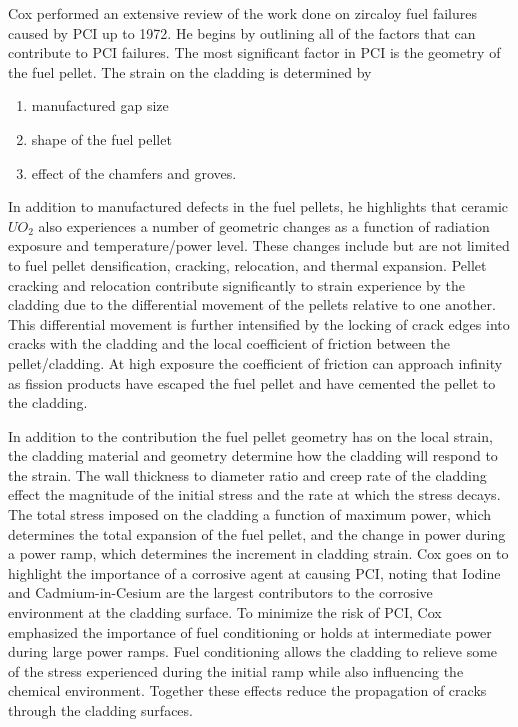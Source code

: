 \documentclass[edeposit,fullpage]{uiucthesis2009}
\begin{document}
Cox \cite{cox_pellet-clad_1990} performed an extensive review of the work done on zircaloy fuel failures caused by \gls{PCI} up to 1972.
He begins by outlining all of the factors that can contribute to \gls{PCI} failures.
The most significant factor in \gls{PCI} is the geometry of the fuel pellet. 
The strain on the cladding is determined by
\begin{enumerate}
\item manufactured gap size
\item shape of the fuel pellet
\item effect of the chamfers and groves.
\end{enumerate} 
In addition to manufactured defects in the fuel pellets, he highlights that ceramic $UO_2$ also experiences a number of geometric changes as a function of radiation exposure and temperature/power level.
These changes include but are not limited to fuel pellet  densification, cracking, relocation, and thermal expansion. 
Pellet cracking and relocation contribute significantly to strain experience by the cladding due to the differential movement of the pellets  relative to one another.
This differential movement is further intensified  by the locking of crack edges into cracks with the cladding and the local coefficient of friction between the pellet/cladding.
At high exposure the coefficient of friction can approach infinity as fission products have escaped the fuel pellet and have cemented the pellet to the cladding. 

In addition to the contribution the fuel pellet geometry has on the local strain, the cladding material and geometry determine how the cladding will respond to the strain.
The wall thickness to diameter ratio and creep rate of the cladding effect the magnitude of the initial stress and the rate at which the stress decays.
The total stress imposed on the cladding a function of maximum power, which determines the total expansion of the fuel pellet, and the change in power during a power ramp, which determines the increment in cladding strain.
Cox goes on to highlight the importance of a corrosive agent at causing \gls{PCI}, noting that Iodine and Cadmium-in-Cesium are the largest contributors to the corrosive environment at the cladding surface.
To minimize the risk of \gls{PCI}, Cox emphasized the importance of fuel conditioning or holds at intermediate power during large power ramps.
Fuel conditioning allows the cladding to relieve some of the stress experienced during the initial ramp while also influencing the chemical environment.
Together these effects reduce the propagation of cracks through the cladding surfaces.
\end{document}
